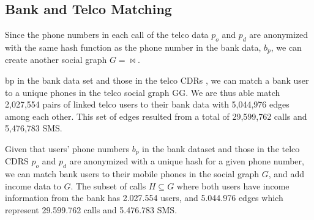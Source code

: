 \subsection{Bank and Telco Matching}

Since the phone numbers in each call of the telco data $ p_o $ and $ p_d $ are anonymized with the same hash function as the phone number in the bank data, $ b_p $, we can create another social graph $ G = \bowtie $.

 bp in the bank data set and those in the telco CDRs , we can match a bank user to a unique phones in the telco social graph GG. We are thus able match 2,027,554 pairs of linked telco users to their bank data with 5,044,976 edges among each other. This set of edges resulted from a total of 29,599,762 calls and 5,476,783 SMS.

Given that users' phone numbers \( b_p \) in the bank dataset and those in the telco CDRS \( p_o \) and \( p_d \) are anonymized with a unique hash for a given phone number, we can match bank users to their mobile phones in the social graph $ G $, and add income data to \( G \). The subset of calls \( H \subseteq G \) where both users have income information from the bank has \num{2,027,554} users, and \num{5,044,976} edges which represent \num{29,599,762} calls and \num{5,476,783} SMS.

